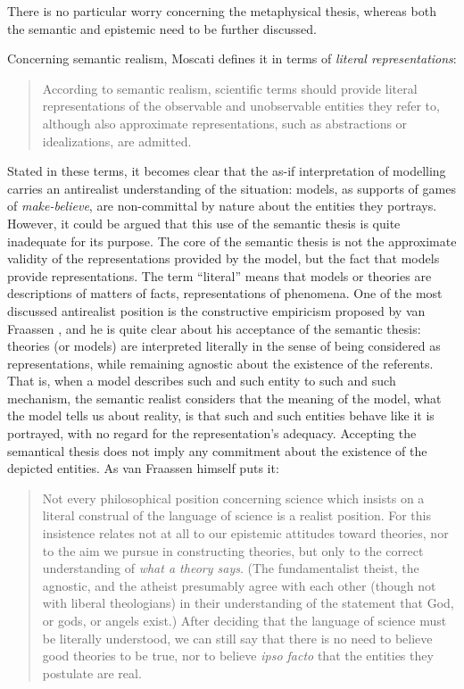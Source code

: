 \documentclass[a4paper,11pt]{article}
\theoremstyle{definition}
\begin{document}
There is no particular worry concerning the metaphysical thesis, whereas both the semantic and epistemic need to be further discussed.

Concerning semantic realism, Moscati defines it in terms of \textit{literal representations}:

\begin{quote}
    According to semantic realism, scientific terms should provide literal representations of the observable and unobservable entities they refer to, although also approximate representations, such as abstractions or idealizations, are admitted. \citep[p.~18]{Moscati2023}
\end{quote}

Stated in these terms, it becomes clear that the as-if interpretation of modelling carries an antirealist understanding of the situation: models, as supports of games of \textit{make-believe}, are non-committal by nature about the entities they portrays. However, it could be argued that this use of the semantic thesis is quite inadequate for its purpose. The core of the semantic thesis is not the approximate validity of the representations provided by the model, but the fact that models provide representations. The term ``literal'' means that models or theories are descriptions of matters of facts, representations of phenomena. One of the most discussed antirealist position is the constructive empiricism proposed by van Fraassen \citep{vanFraassen1980}, and he is quite clear about his acceptance of the semantic thesis: theories (or models) are interpreted literally in the sense of being considered as representations, while remaining agnostic about the existence of the referents. That is, when a model describes such and such entity to such and such mechanism, the semantic realist considers that the meaning of the model, what the model tells us about reality, is that such and such entities behave like it is portrayed, with no regard for the representation's adequacy. Accepting the semantical thesis does not imply any commitment about the existence of the depicted entities. As van Fraassen himself puts it:

\begin{quote}
    Not every philosophical position concerning science which insists on a literal construal of the language of science is a realist position. For this insistence relates not at all to our epistemic attitudes toward theories, nor to the aim we pursue in constructing theories, but only to the correct understanding of \textit{what a theory says}. (The fundamentalist theist, the agnostic, and the atheist presumably agree with each other (though not with liberal theologians) in their understanding of the statement that God, or gods, or angels exist.) After deciding that the language of science must be literally understood, we can still say that there is no need to believe good theories to be true, nor to believe \textit{ipso facto} that the entities they postulate are real. \citep[pp.~11-12]{vanFraassen1980}
\end{quote}
\end{document}
